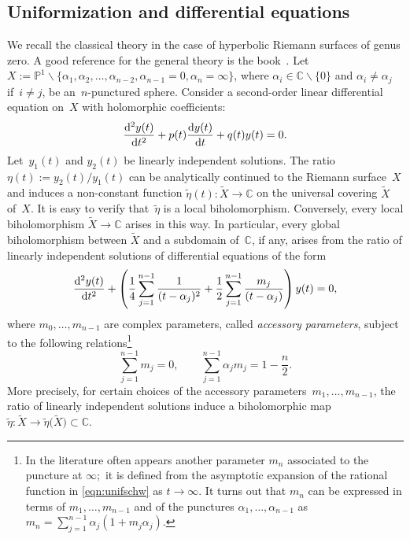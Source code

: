 \documentclass[pdftex]{sigma}
\newcommand{\C}{\mathbb{C}}
\newcommand{\pro}{\mathbb{P}}
\numberwithin{equation}{section}
\begin{document}
\subsection{Uniformization and differential equations}
We recall the classical theory in the case of hyperbolic Riemann surfaces of genus zero. A good reference for the general theory is the book~\cite{SGervais}.
Let $X:=\pro^1\smallsetminus\{\alpha_1,\alpha_2,\dots,\alpha_{n-2},\alpha_{n-1}=0,\alpha_n=\infty\}$, where $\alpha_i\in\C\smallsetminus\{0\}$ and $\alpha_i\neq \alpha_j$ if~$i\neq j$, be an~$n$-punctured sphere.
Consider a second-order linear differential equation on~$X$ with holomorphic coefficients:
\[
\frac{{\rm d}^2y(t)}{{\rm d}t^2}+p(t)\frac{{\rm d}y(t)}{{\rm d}t}+q(t)y(t)=0.
\]
Let~$y_1(t)$ and $y_2(t)$ be linearly independent solutions. The ratio $\eta(t):=y_2(t)/y_1(t)$ can be analytically continued to the Riemann surface~$X$ and induces a non-constant function \mbox{$\widetilde{\eta}(t)\colon\widetilde{X}\to\C$} on the universal covering $\widetilde{X}$ of~$X$. It is easy to verify that~$\widetilde{\eta}$ is a local biholomorphism. Conversely, every local biholomorphism $\widetilde{X}\to\C$ arises in this way. In particular, every global biholomorphism between $\widetilde{X}$ and a subdomain of~$\C$, if any, arises from the ratio of linearly independent solutions of differential equations of the form \cite{SGervais, Ford}
\begin{equation}\label{eqn:unifschw}
\frac{{\rm d}^2y(t)}{{\rm d}t^2} + \left(\frac{1}{4}\sum_{j=1}^{n-1}{\frac{1}{(t- \alpha_j)^2}}+\frac{1}{2}\sum_{j=1}^{n-1}{\frac{m_j}{(t-\alpha_j)}}\right)y(t)=0 ,
\end{equation}
where $m_0,\dots,m_{n-1}$ are complex parameters, called \emph{accessory parameters}, subject to the following relations\footnote{In the literature often appears another parameter $m_n$ associated to the puncture at $\infty;$ it is defined from the asymptotic expansion of the rational function in \eqref{eqn:unifschw} as $t\to\infty$. It turns out that $m_n$ can be expressed in terms of $m_1,\dots,m_{n-1}$ and of the punctures $\alpha_1,\dots,\alpha_{n-1}$ as $m_n=\sum_{j=1}^{n-1}{\alpha_j(1+m_j\alpha_j)}$.}
\begin{equation} \label{eqn:rel}
\sum_{j=1}^{n-1}{m_j}=0,\qquad\sum_{j=1}^{n-1}{\alpha_jm_j}=1-\frac{n}{2}.
\end{equation}
More precisely, for certain choices of the accessory parameters~$m_1,\dots,m_{n-1}$, the ratio of linearly independent solutions induce a biholomorphic map~$\widetilde{\eta}\colon\widetilde{X}\to \widetilde{\eta}\big(\widetilde{X}\big)\subset\C$.
\end{document}
